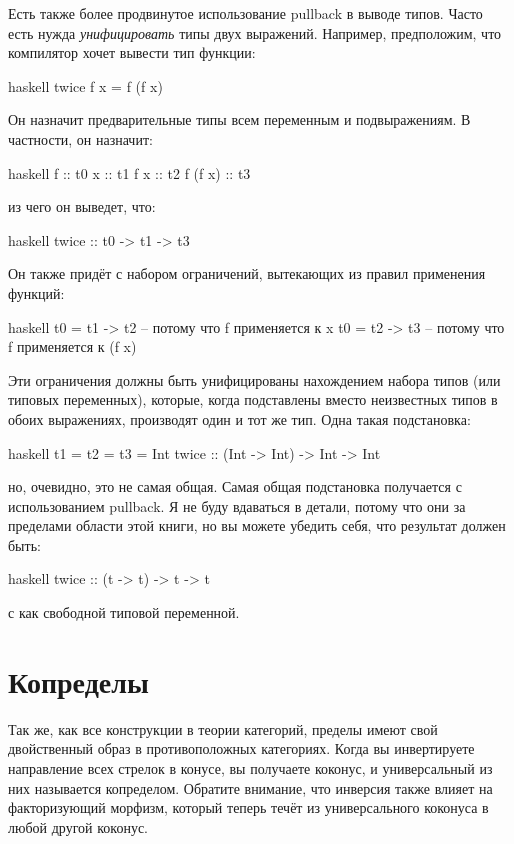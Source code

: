 \noindent
Есть также более продвинутое использование pullback в выводе типов. Часто
есть нужда \emph{унифицировать} типы двух выражений. Например,
предположим, что компилятор хочет вывести тип функции:

\begin{snip}{haskell}
twice f x = f (f x)
\end{snip}
Он назначит предварительные типы всем переменным и подвыражениям.
В частности, он назначит:

\begin{snip}{haskell}
f       :: t0
x       :: t1
f x     :: t2
f (f x) :: t3
\end{snip}
из чего он выведет, что:

\begin{snip}{haskell}
twice :: t0 -> t1 -> t3
\end{snip}
Он также придёт с набором ограничений, вытекающих из правил
применения функций:

\begin{snip}{haskell}
t0 = t1 -> t2 -- потому что f применяется к x
t0 = t2 -> t3 -- потому что f применяется к (f x)
\end{snip}
Эти ограничения должны быть унифицированы нахождением набора типов (или типовых
переменных), которые, когда подставлены вместо неизвестных типов в обоих
выражениях, производят один и тот же тип. Одна такая подстановка:

\begin{snip}{haskell}
t1 = t2 = t3 = Int
twice :: (Int -> Int) -> Int -> Int
\end{snip}
но, очевидно, это не самая общая. Самая общая
подстановка получается с использованием pullback. Я не буду вдаваться в детали,
потому что они за пределами области этой книги, но вы можете убедить
себя, что результат должен быть:

\begin{snip}{haskell}
twice :: (t -> t) -> t -> t
\end{snip}
с  как свободной типовой переменной.

\section{Копределы}

Так же, как все конструкции в теории категорий, пределы имеют свой двойственный
образ в противоположных категориях. Когда вы инвертируете направление всех
стрелок в конусе, вы получаете коконус, и универсальный из них
называется копределом. Обратите внимание, что инверсия также влияет на факторизующий
морфизм, который теперь течёт из универсального коконуса в любой другой
коконус.

